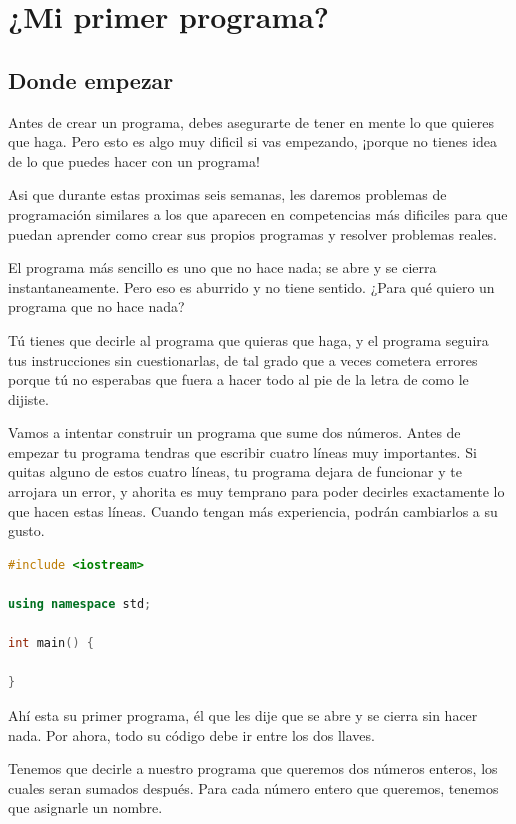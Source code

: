 \documentclass{article}
\begin{document}
\section{¿Mi primer programa?}

\subsection{Donde empezar}

Antes de crear un programa, debes asegurarte de tener en mente lo que quieres que haga. Pero esto es algo muy dificil si vas empezando, ¡porque no tienes idea de lo que puedes hacer con un programa!

Asi que durante estas proximas seis semanas, les daremos problemas de programación similares a los que aparecen en competencias más dificiles para que puedan aprender como crear sus propios programas y resolver problemas reales.

El programa más sencillo es uno que no hace nada; se abre y se cierra instantaneamente. Pero eso es aburrido y no tiene sentido. ¿Para qué quiero un programa que no hace nada?

Tú tienes que decirle al programa que quieras que haga, y el programa seguira tus instrucciones sin cuestionarlas, de tal grado que a veces cometera errores porque tú no esperabas que fuera a hacer todo al pie de la letra de como le dijiste.

Vamos a intentar construir un programa que sume dos números. Antes de empezar tu programa tendras que escribir cuatro líneas muy importantes. Si quitas alguno de estos cuatro líneas, tu programa dejara de funcionar y te arrojara un error, y ahorita es muy temprano para poder decirles exactamente lo que hacen estas líneas. Cuando tengan más experiencia, podrán cambiarlos a su gusto.

\begin{lstlisting}[language=C++, caption=Las cuatro líneas esenciales]
#include <iostream>

using namespace std;

int main() {

}
\end{lstlisting}

Ahí esta su primer programa, él que les dije que se abre y se cierra sin hacer nada. Por ahora, todo su código debe ir entre los dos llaves.

Tenemos que decirle a nuestro programa que queremos dos números enteros, los cuales seran sumados después. Para cada número entero que queremos, tenemos que asignarle un nombre.
\end{document}
